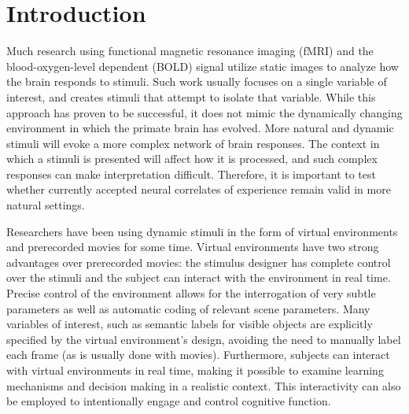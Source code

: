 \documentclass[5p,authoryear]{elsarticle}
\begin{document}
\section{Introduction}
Much research using functional magnetic resonance imaging (fMRI) and the blood-oxygen-level dependent (BOLD) signal utilize static images to analyze how the brain responds to stimuli.
Such work usually focuses on a single variable of interest, and creates stimuli that attempt to isolate that variable.
While this approach has proven to be successful, it does not mimic the dynamically changing environment in which the primate brain has evolved.
More natural and dynamic stimuli will evoke a more complex network of brain responses.
The context in which a stimuli is presented will affect how it is processed, and such complex responses can make interpretation difficult.
Therefore, it is important to test whether currently accepted neural correlates of experience remain valid in more natural settings.

Researchers have been using dynamic stimuli in the form of virtual environments \citep{Maguire1998,Calhoun2002,King2006,Mathiak2006,Spiers2007a,Hassabis2009} and prerecorded movies \citep{Hasson2004,Chadwick2010,Nishimoto2011} for some time.
Virtual environments have two strong advantages over prerecorded movies: the stimulus designer has complete control over the stimuli and the subject can interact with the environment in real time.
Precise control of the environment allows for the interrogation of very subtle parameters as well as automatic coding of relevant scene parameters.
Many variables of interest, such as semantic labels for visible objects are explicitly specified by the virtual environment's design, avoiding the need to manually label each frame (as is usually done with movies).
Furthermore, subjects can interact with virtual environments in real time,  making it possible to examine learning mechanisms and decision making in a realistic context.
This interactivity can also be employed to intentionally engage and control cognitive function.
\end{document}
